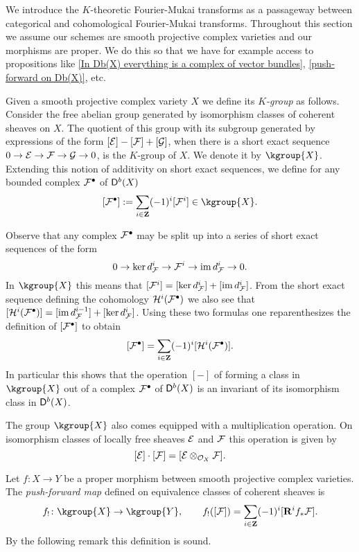We introduce the $K$-theoretic Fourier-Mukai transforms as a passageway between categorical and cohomological Fourier-Mukai transforms. Throughout this section we assume our schemes are smooth projective complex varieties and our morphisms are proper. We do this so that we have for example access to propositions like \ref{In Db(X) everything is a complex of vector bundles}, \ref{push-forward on Db(X)}, etc.

Given a smooth projective complex variety $X$ we define its \emph{$K$-group} as follows. Consider the free abelian group generated by isomorphism classes of coherent sheaves on $X$. The quotient of this group with its subgroup generated by expressions of the form $[\mathcal E] - [\mathcal F] + [\mathcal G]$, when there is a short exact sequence $0 \to \mathcal E \to \mathcal F \to \mathcal G \to 0$, is the $K$-group of $X$. We denote it by $\kgroup{X}$. Extending this notion of additivity on short exact sequences, we define for any bounded complex $\mathcal F^\bullet$ of $\mathsf{D}^b(X)$ 
\[
    [\F^\bullet] := \sum_{i \in \Z}(-1)^i[\F^i] \in \kgroup{X}.
\]
\begin{remark}
    Observe that any complex $\mathcal F^\bullet$ may be split up into a series of short exact sequences of the form
    \[
        0 \to \ker d^{i}_\mathcal F \to \mathcal F^i \to \operatorname{im} d^i_\mathcal F \to 0.
    \]
    In $\kgroup{X}$ this means that $[\mathcal F^i] = [\ker d^{i}_\mathcal F] + [\operatorname{im} d^i_\mathcal F]$. From the short exact sequence defining the cohomology $\mathcal H^i(\mathcal F^\bullet)$ we also see that $[\mathcal H^i(\mathcal F^\bullet)] = [\operatorname{im} d^{i-1}_\mathcal F] + [\ker d^{i}_\mathcal F]$. Using these two formulas one reparenthesizes the definition of $[\mathcal F^\bullet]$ to obtain
    \[
        [\mathcal F^\bullet] = \sum_{i \in \mathbf Z}(-1)^i[\mathcal H^i(\mathcal F^\bullet)].
    \]
    In particular this shows that the operation $[-]$ of forming a class in $\kgroup{X}$ out of a complex $\mathcal F^\bullet$ of $\mathsf{D}^b(X)$ is an invariant of its isomorphism class in $\mathsf{D}^b(X)$.
\end{remark}


The group $\kgroup{X}$ also comes equipped with a multiplication operation. On isomorphism classes of locally free sheaves $\mathcal E$ and $\mathcal F$ this operation is given by
\[
    [\mathcal E]\cdot[\mathcal F] = [\mathcal E \otimes_{{\mathcal{O}_{X}}} \mathcal F].
\]

\begin{definition}
    Let $f \colon X \to Y$ be a proper morphism between smooth projective complex varieties. 
    The \emph{push-forward map} defined on equivalence classes of coherent sheaves is
    \[
        f_! \colon \kgroup{X} \to \kgroup{Y}, \qquad f_!([\F]) = \sum_{i \in \Z}(-1)^i[\rderived{i}{f_*}\F].
    \]
    By the following remark this definition is sound.
\end{definition}


